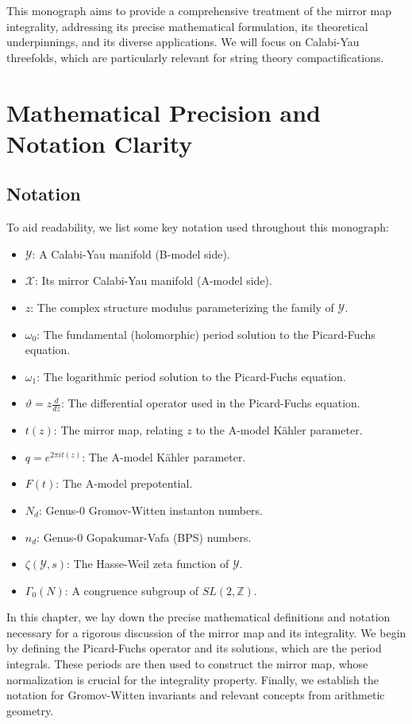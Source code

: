\documentclass{book}
\newcommand{\varthetaop}{\vartheta} %
\newcommand{\calY}{\mathcal{Y}} %
\newcommand{\calX}{\mathcal{X}} %
\newcommand{\omegaf}{\omega_0} %
\newcommand{\omegal}{\omega_1} %
\newcommand{\qexp}{q} %
\newcommand{\zmod}{z} %
\newcommand{\tmap}{t} %
\newcommand{\Fgen}{F} %
\newcommand{\Nd}{N_d} %
\newcommand{\nd}{n_d} %
\newcommand{\Zeta}{\zeta} %
\theoremstyle{definition}
\begin{document}
This monograph aims to provide a comprehensive treatment of the mirror map integrality, addressing its precise mathematical formulation, its theoretical underpinnings, and its diverse applications. We will focus on Calabi-Yau threefolds, which are particularly relevant for string theory compactifications.

\chapter{Mathematical Precision and Notation Clarity}
\label{chap:precision}

\section*{Notation}
To aid readability, we list some key notation used throughout this monograph:
\begin{itemize}
    \item $\calY$: A Calabi-Yau manifold (B-model side).
    \item $\calX$: Its mirror Calabi-Yau manifold (A-model side).
    \item $\zmod$: The complex structure modulus parameterizing the family of $\calY$.
    \item $\omegaf$: The fundamental (holomorphic) period solution to the Picard-Fuchs equation.
    \item $\omegal$: The logarithmic period solution to the Picard-Fuchs equation.
    \item $\varthetaop = \zmod \frac{d}{d\zmod}$: The differential operator used in the Picard-Fuchs equation.
    \item $\tmap(\zmod)$: The mirror map, relating $\zmod$ to the A-model K\"ahler parameter.
    \item $\qexp = e^{2\pi i \tmap(\zmod)}$: The A-model K\"ahler parameter.
    \item $\Fgen(\tmap)$: The A-model prepotential.
    \item $\Nd$: Genus-0 Gromov-Witten instanton numbers.
    \item $\nd$: Genus-0 Gopakumar-Vafa (BPS) numbers.
    \item $\Zeta(\calY, s)$: The Hasse-Weil zeta function of $\calY$.
    \item $\Gamma_0(N)$: A congruence subgroup of $SL(2, \mathbb{Z})$.
\end{itemize}

In this chapter, we lay down the precise mathematical definitions and notation necessary for a rigorous discussion of the mirror map and its integrality. We begin by defining the Picard-Fuchs operator and its solutions, which are the period integrals. These periods are then used to construct the mirror map, whose normalization is crucial for the integrality property. Finally, we establish the notation for Gromov-Witten invariants and relevant concepts from arithmetic geometry.
\end{document}
